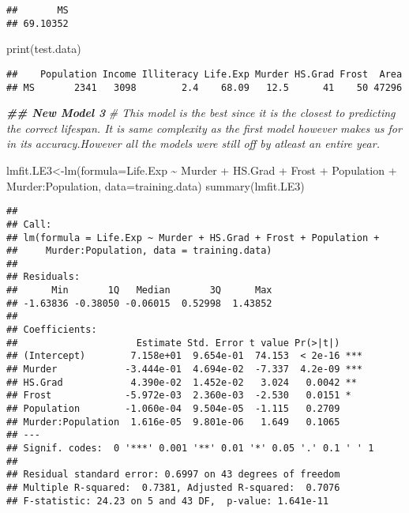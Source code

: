 \documentclass[
]{article}
\newenvironment{Shaded}{\begin{snugshade}}{\end{snugshade}}
\newcommand{\AttributeTok}[1]{\textcolor[rgb]{0.77,0.63,0.00}{#1}}
\newcommand{\CommentTok}[1]{\textcolor[rgb]{0.56,0.35,0.01}{\textit{#1}}}
\newcommand{\DocumentationTok}[1]{\textcolor[rgb]{0.56,0.35,0.01}{\textbf{\textit{#1}}}}
\newcommand{\FunctionTok}[1]{\textcolor[rgb]{0.00,0.00,0.00}{#1}}
\newcommand{\NormalTok}[1]{#1}
\newcommand{\OtherTok}[1]{\textcolor[rgb]{0.56,0.35,0.01}{#1}}
\newcommand{\SpecialCharTok}[1]{\textcolor[rgb]{0.00,0.00,0.00}{#1}}
\begin{document}
\begin{verbatim}
##       MS 
## 69.10352
\end{verbatim}

\begin{Shaded}
\begin{Highlighting}[]
\FunctionTok{print}\NormalTok{(test.data)}
\end{Highlighting}
\end{Shaded}

\begin{verbatim}
##    Population Income Illiteracy Life.Exp Murder HS.Grad Frost  Area
## MS       2341   3098        2.4    68.09   12.5      41    50 47296
\end{verbatim}

\begin{Shaded}
\begin{Highlighting}[]
\DocumentationTok{\#\# New Model 3}
\CommentTok{\# This model is the best since it is the closest to predicting the correct lifespan. It is same complexity as the first model however makes us for in its accuracy.However all the models were still off by atleast an entire year.}

\NormalTok{lmfit.LE3}\OtherTok{\textless{}{-}}\FunctionTok{lm}\NormalTok{(}\AttributeTok{formula=}\NormalTok{Life.Exp }\SpecialCharTok{\textasciitilde{}}\NormalTok{ Murder }\SpecialCharTok{+}\NormalTok{ HS.Grad }\SpecialCharTok{+}\NormalTok{ Frost }\SpecialCharTok{+}\NormalTok{ Population }\SpecialCharTok{+}\NormalTok{ Murder}\SpecialCharTok{:}\NormalTok{Population, }\AttributeTok{data=}\NormalTok{training.data)}
\FunctionTok{summary}\NormalTok{(lmfit.LE3)}
\end{Highlighting}
\end{Shaded}

\begin{verbatim}
## 
## Call:
## lm(formula = Life.Exp ~ Murder + HS.Grad + Frost + Population + 
##     Murder:Population, data = training.data)
## 
## Residuals:
##      Min       1Q   Median       3Q      Max 
## -1.63836 -0.38050 -0.06015  0.52998  1.43852 
## 
## Coefficients:
##                     Estimate Std. Error t value Pr(>|t|)    
## (Intercept)        7.158e+01  9.654e-01  74.153  < 2e-16 ***
## Murder            -3.444e-01  4.694e-02  -7.337  4.2e-09 ***
## HS.Grad            4.390e-02  1.452e-02   3.024   0.0042 ** 
## Frost             -5.972e-03  2.360e-03  -2.530   0.0151 *  
## Population        -1.060e-04  9.504e-05  -1.115   0.2709    
## Murder:Population  1.616e-05  9.801e-06   1.649   0.1065    
## ---
## Signif. codes:  0 '***' 0.001 '**' 0.01 '*' 0.05 '.' 0.1 ' ' 1
## 
## Residual standard error: 0.6997 on 43 degrees of freedom
## Multiple R-squared:  0.7381, Adjusted R-squared:  0.7076 
## F-statistic: 24.23 on 5 and 43 DF,  p-value: 1.641e-11
\end{verbatim}
\end{document}
